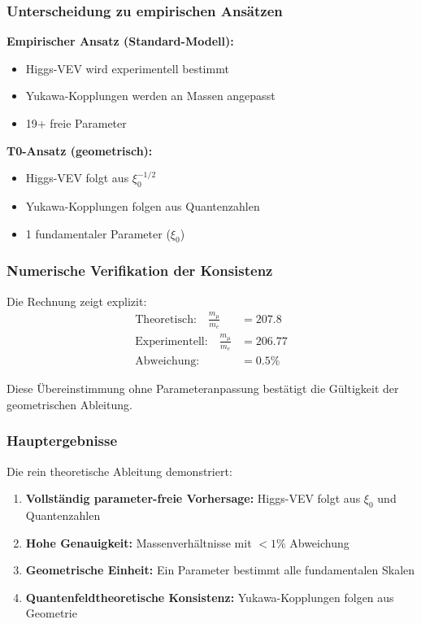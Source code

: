 \subsubsection{Unterscheidung zu empirischen Ansätzen}

\textbf{Empirischer Ansatz (Standard-Modell):}
\begin{itemize}
	\item Higgs-VEV wird experimentell bestimmt
	\item Yukawa-Kopplungen werden an Massen angepasst
	\item 19+ freie Parameter
\end{itemize}

\textbf{T0-Ansatz (geometrisch):}
\begin{itemize}
	\item Higgs-VEV folgt aus $\xi_0^{-1/2}$
	\item Yukawa-Kopplungen folgen aus Quantenzahlen
	\item 1 fundamentaler Parameter ($\xi_0$)
\end{itemize}

\subsubsection{Numerische Verifikation der Konsistenz}

Die Rechnung zeigt explizit:
\begin{align}
	\text{Theoretisch:} \quad \frac{m_\mu}{m_e} &= 207.8\\
	\text{Experimentell:} \quad \frac{m_\mu}{m_e} &= 206.77\\
	\text{Abweichung:} \quad &= 0.5\%
\end{align}

Diese Übereinstimmung ohne Parameteranpassung bestätigt die Gültigkeit der geometrischen Ableitung.

\subsubsection{Hauptergebnisse}

Die rein theoretische Ableitung demonstriert:

\begin{enumerate}
	\item \textbf{Vollständig parameter-freie Vorhersage:} Higgs-VEV folgt aus $\xi_0$ und Quantenzahlen
	\item \textbf{Hohe Genauigkeit:} Massenverhältnisse mit $< 1\%$ Abweichung
	\item \textbf{Geometrische Einheit:} Ein Parameter bestimmt alle fundamentalen Skalen
	\item \textbf{Quantenfeldtheoretische Konsistenz:} Yukawa-Kopplungen folgen aus Geometrie
\end{enumerate}

